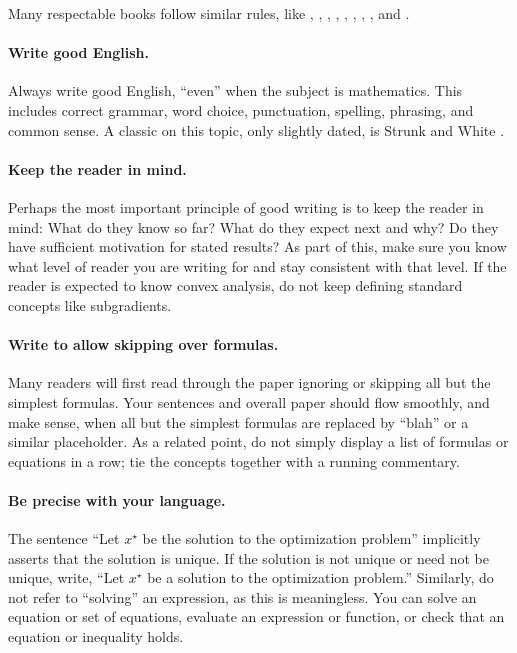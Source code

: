 \documentclass[12pt]{article}
\begin{document}
Many respectable books follow similar rules, like
\cite{BoV:04},
\cite[p.~23]{Cover:1991},
\cite[p.~26]{Hastie:2001},
\cite[p.~21]{Sipser:2001},
\cite[p.~25]{Cormen:2001},
\cite[p.~15]{Rudin:1976},
\cite[p.~18]{Evans:2010},
\cite[p.~3]{Goldstein:1980}, and 
\cite{Knuth:1973}.

\paragraph{Write good English.}
Always write good English, ``even'' when the subject is mathematics. This
includes correct grammar, word choice, punctuation, spelling, phrasing,
and common sense. 
A classic on this topic, only slightly dated, 
is Strunk and White \cite{SW:59}.

\paragraph{Keep the reader in mind.} Perhaps the most important principle of
good writing is to keep the reader in mind: What do they know so far? What do
they expect next and why? Do they have sufficient motivation for stated
results? As part of this, make sure you know what level of reader you are
writing for and stay consistent with that level. If the reader is expected to
know convex analysis, do not keep defining standard concepts like subgradients.

\paragraph{Write to allow skipping over formulas.}
Many readers will first read through the paper ignoring or skipping all but the
simplest formulas. Your sentences and overall paper should flow smoothly, and
make sense, when all but the simplest formulas are replaced by ``blah'' or a
similar placeholder.  As a related point, do not simply display a list of
formulas or equations in a row; tie the concepts together with a running
commentary.

\paragraph{Be precise with your language.}
The sentence ``Let $x^\star$ be the solution to the optimization
problem'' implicitly asserts that the solution is unique. If the solution is
not unique or need not be unique, write, ``Let $x^\star$ be a solution to the
optimization problem.'' Similarly, do not refer to ``solving'' an expression,
as this is meaningless.  You can solve an equation or set of equations,
evaluate an expression or function, or check that an equation or inequality
holds.
\end{document}
